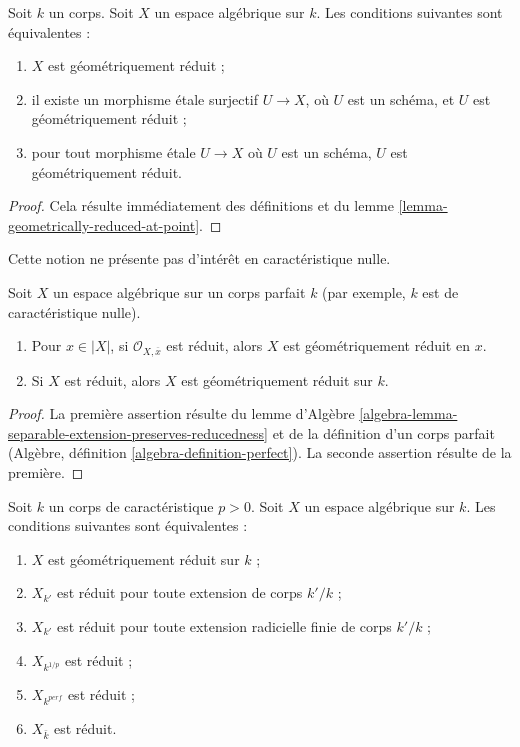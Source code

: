 \begin{lemma}
\label{lemma-geometrically-reduced}
Soit $k$ un corps. Soit $X$ un espace algébrique sur $k$.
Les conditions suivantes sont équivalentes :
\begin{enumerate}
\item $X$ est géométriquement réduit ;
\item il existe un morphisme \'etale surjectif $U \to X$, où $U$
est un schéma, et $U$ est géométriquement réduit ;
\item pour tout morphisme \'etale $U \to X$
où $U$ est un schéma, $U$ est géométriquement réduit.
\end{enumerate}
\end{lemma}

\begin{proof}
Cela résulte immédiatement des définitions et du
lemme \ref{lemma-geometrically-reduced-at-point}.
\end{proof}

\noindent
Cette notion ne présente pas d'intérêt en caractéristique nulle.

\begin{lemma}
\label{lemma-perfect-reduced}
Soit $X$ un espace algébrique sur un corps parfait $k$ (par exemple,
$k$ est de caractéristique nulle).
\begin{enumerate}
\item Pour $x \in |X|$, si $\mathcal{O}_{X, \overline{x}}$ est
réduit, alors $X$ est géométriquement réduit en $x$.
\item Si $X$ est réduit, alors $X$ est géométriquement réduit sur $k$.
\end{enumerate}
\end{lemma}

\begin{proof}
La première assertion résulte du
lemme d'Algèbre \ref{algebra-lemma-separable-extension-preserves-reducedness}
et de la définition d'un corps parfait
(Algèbre, définition \ref{algebra-definition-perfect}).
La seconde assertion résulte de la première.
\end{proof}

\begin{lemma}
\label{lemma-geometrically-reduced-positive-characteristic}
Soit $k$ un corps de caractéristique $p > 0$. Soit $X$ un espace algébrique
sur $k$. Les conditions suivantes sont équivalentes :
\begin{enumerate}
\item $X$ est géométriquement réduit sur $k$ ;
\item $X_{k'}$ est réduit pour toute extension de corps $k'/k$ ;
\item $X_{k'}$ est réduit pour toute
extension radicielle finie de corps $k'/k$ ;
\item $X_{k^{1/p}}$ est réduit ;
\item $X_{k^{perf}}$ est réduit ;
\item $X_{\bar k}$ est réduit.
\end{enumerate}
\end{lemma}


